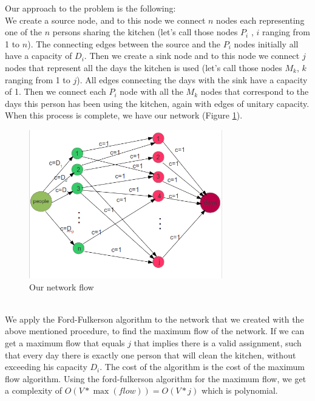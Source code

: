 Our approach to the problem is the following: \\ 
We create a source node, and to this node we connect $n$ nodes each representing one of the $n$ persons sharing the kitchen (let's call those nodes $P_i$ , $i$ ranging from 1 to $n$). The connecting edges between the source and the $P_i$ nodes initially all have a capacity of $D_i$. Then we create a sink node and to this node we connect $j$ nodes that represent all the days the kitchen is used (let's call those nodes $M_k$, $k$ ranging from 1 to $j$). All edges connecting the days with the sink have a capacity of 1. Then we connect each $P_i$ node with all the $M_k$ nodes that correspond to the days this person has been using the kitchen, again with edges of unitary capacity. When this process is complete, we have our network (Figure \ref{fig:prob2}).\\
\begin{figure}[ht]
\centering
\includegraphics[width=0.75\textwidth]{prob2}
\caption{Our network flow}
\label{fig:prob2}
\end{figure}
\\ 

We apply the Ford-Fulkerson algorithm to the network that we created with the above mentioned procedure, to find the maximum flow of the network. If we can get a maximum flow that equals $j$ that implies there is a valid assignment, such that every day there is exactly one person that will clean the kitchen, without exceeding his capacity $D_i$. The cost of the algorithm is the cost of the maximum flow algorithm. Using the ford-fulkerson algorithm for the maximum flow, we get a complexity of $O(V * \max (flow)) = O(V * j)$ which is polynomial.